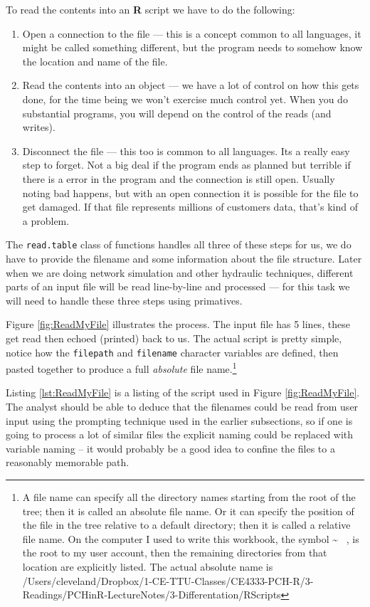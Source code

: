 To read the contents into an \textbf{R} script we have to do the following:
\begin{enumerate}
\item Open a connection to the file --- this is a concept common to all languages, it might be called something different, but the program needs to somehow know the location and name of the file.
\item Read the contents into an object --- we have a lot of control on how this gets done, for the time being we won't exercise much control yet.  When you do substantial programs, you will depend on the control of the reads (and writes).
\item Disconnect the file --- this too is common to all languages.  Its a really easy step to forget.  Not a big deal if the program ends as planned but terrible if there is a error in the program and the connection is still open.  Usually noting bad happens, but with an open connection it is possible for the file to get damaged.   If that file represents millions of customers data, that's kind of a problem.
\end{enumerate}
\newpage
The \texttt{read.table} class of functions handles all three of these steps for us, we do have to provide the filename and some information about the file structure.  Later when we are doing network simulation and other hydraulic techniques, different parts of an input file will be read line-by-line and processed --- for this task we will need to handle these three steps using primatives.

Figure \ref{fig:ReadMyFile} illustrates the process.  The input file has 5 lines, these get read then echoed (printed) back to us.  The actual script is pretty simple, notice how the \texttt{filepath} and \texttt{filename} character variables are defined, then pasted together to produce a full \textit{absolute} file name.\footnote{A file name can specify all the directory names starting from the root of the tree; then it is called an absolute file name. Or it can specify the position of the file in the tree relative to a default directory; then it is called a relative file name. On the computer I used to write this workbook, the symbol \~ ~, is the root to my user account, then the remaining directories from that location are explicitly listed.  The actual absolute name is 
/Users/cleveland/Dropbox/1-CE-TTU-Classes/CE4333-PCH-R/3-Readings/PCHinR-LectureNotes/3-Differentation/RScripts}

Listing \ref{lst:ReadMyFile} is a listing of the script used in Figure \ref{fig:ReadMyFile}.  
The analyst should be able to deduce that the filenames could be read from user input using the prompting technique used in the earlier subsections, so if one is going to process a lot of similar files the explicit naming could be replaced with variable naming -- it would probably be a good idea to confine the files to a reasonably memorable path.

